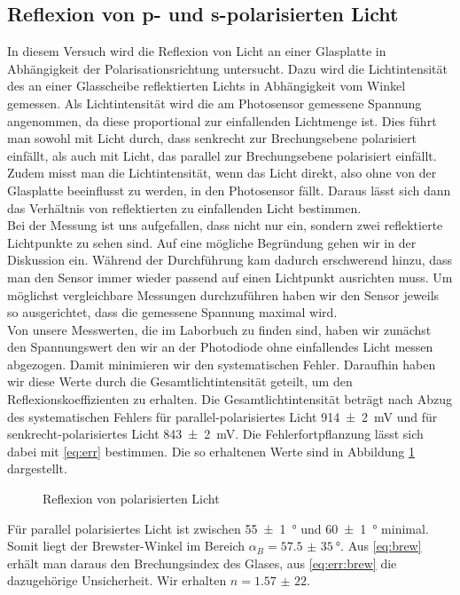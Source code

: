 \subsection{Reflexion von p- und s-polarisierten Licht}
In diesem Versuch wird die Reflexion von Licht an einer Glasplatte in Abhängigkeit der Polarisationsrichtung untersucht. Dazu wird die Lichtintensität des an einer Glasscheibe reflektierten Lichts in Abhängigkeit vom Winkel gemessen. Als Lichtintensität wird die am Photosensor gemessene Spannung angenommen, da diese proportional zur einfallenden Lichtmenge ist. Dies führt man sowohl mit Licht durch, dass senkrecht zur Brechungsebene polarisiert einfällt, als auch mit Licht, das parallel zur Brechungsebene polarisiert einfällt. Zudem misst man die Lichtintensität, wenn das Licht direkt, also ohne von der Glasplatte beeinflusst zu werden, in den Photosensor fällt. Daraus lässt sich dann das Verhältnis von reflektierten zu einfallenden Licht bestimmen.\\
Bei der Messung ist uns aufgefallen, dass nicht nur ein, sondern zwei reflektierte Lichtpunkte zu sehen sind. Auf eine mögliche Begründung gehen wir in der Diskussion ein. Während der Durchführung kam dadurch erschwerend hinzu, dass man den Sensor immer wieder passend auf einen Lichtpunkt ausrichten muss. Um möglichst vergleichbare Messungen durchzuführen haben wir den Sensor jeweils so ausgerichtet, dass die gemessene Spannung maximal wird.\\
Von unsere Messwerten, die im Laborbuch zu finden sind, haben wir zunächst den Spannungswert den wir an der Photodiode ohne einfallendes Licht messen abgezogen. Damit minimieren wir den systematischen Fehler. Daraufhin haben wir diese Werte durch die Gesamtlichtintensität geteilt, um den Reflexionskoeffizienten zu erhalten. Die Gesamtlichtintensität beträgt nach Abzug des systematischen Fehlers für parallel-polarisiertes Licht \SI{914(2)}{mV} und für senkrecht-polarisiertes Licht \SI{843(2)}{mV}. Die Fehlerfortpflanzung lässt sich dabei mit \eqref{eq:err} bestimmen. Die so erhaltenen Werte sind in Abbildung \ref{fig:refp} dargestellt.\\


\begin{figure}[H]
\centering

\caption{Reflexion von polarisierten Licht}
\label{fig:refp}
\end{figure}
Für parallel polarisiertes Licht ist zwischen \SI{55(1)}{\degree} und \SI{60(1)}{\degree} minimal. Somit liegt der Brewster-Winkel im Bereich $ \alpha_B = \SI{57,5(35)}{\degree} $.
Aus \eqref{eq:brew} erhält man daraus den Brechungsindex des Glases, aus \eqref{eq:err:brew} die dazugehörige Unsicherheit. Wir erhalten $ n = \num{1,57(22)} $.

